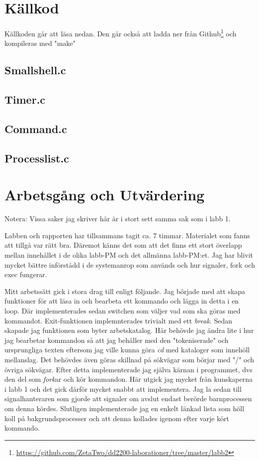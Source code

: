\documentclass[10pt,a4paper]{article}
\begin{document}
\clearpage
\section{Källkod}
Källkoden går att läsa nedan. Den går också att ladda ner från Github\footnote{\url{https://github.com/ZetaTwo/dd2200-laborationer/tree/master/labb2}} och kompileras med "make"

\subsection{Smallshell.c}

\subsection{Timer.c}

\subsection{Command.c}

\subsection{Processlist.c}

\clearpage

\section{Arbetsgång och Utvärdering}

Notera: Vissa saker jag skriver här är i stort sett samma sak som i labb 1.

Labben och rapporten har tillsammans tagit ca. 7 timmar. Materialet som fanns att tillgå var rätt bra. Däremot känns det som att det finns ett stort överlapp mellan innehållet i de olika labb-PM och det allmänna labb-PM:et. Jag har blivit mycket bättre införstådd i de systemanrop som används och hur signaler, fork och exec fungerar.

Mitt arbetssätt gick i stora drag till enligt följande. Jag började med att skapa funktioner för att läsa in och bearbeta ett kommando och lägga in detta i en loop. Där implementerades sedan switchen som väljer vad som ska göras med kommandot. Exit-funktionen implemnterades trivialt med ett \emph{break}.
Sedan skapade jag funktionen som byter arbetskatalog. Här behövde jag ändra lite i hur jag bearbetar kommandon så att jag behåller med den "tokeniserade" och ursprungliga texten eftersom jag ville kunna göra \emph{cd} med kataloger som innehöll mellanslag. Det behövdes även göras skillnad på sökvägar som börjar med "/" och övriga sökvägar.
Efter detta implementerade jag själva kärnan i programmet, dvs den del som \emph{fork}ar och kör kommandon. Här utgick jag mycket från kunskaperna i labb 1 och det gick därför mycket snabbt att implementera.
Jag la sedan till signalhanteraren som gjorde att signaler om avslut endast berörde barnprocessen om denna kördes.
Slutligen implementerade jag en enkelt länkad lista som höll koll på bakgrundsprocesser och att denna kollades igenom efter varje kört kommando.
\end{document}
